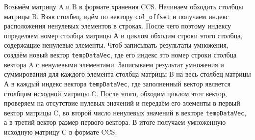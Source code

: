 \documentclass[14pt,a4paper,report]{ncc}
\begin{document}
	
	
	
	
	
	Возьмём матрицу A и B в формате хранения CCS. Начинаем обходить столбцы матрицы B. Взяв столбец, идём по вектору \verb|col_offset| и получаем индекс расположения ненулевых элементов в строках. После чего поэтому индексу определяем номер столбца матрицы А и циклом обходим строки этого столбца, содержащие ненулевые элементы. Чтоб записывать результаты умножения, создаём новый вектор \verb|tempDataVec|, где его индекс это номер строки столбца вектора A с ненулевыми элементами. Записываем результат умножения и суммирования для каждого элемента столбца матрицы B на весь столбец матрицы А в каждый индекс вектора \verb|tempDataVec|, где заполненный вектор является столбцом исходной матрицы C. После этого, обходим циклом этот вектор, проверяем на отсутствие нулевых значений и передаём его элементы в первый вектор матрицы C, во второй число ненулевых значений в векторе \verb|tempDataVec|, а в третий вектор размер первого вектора. В итоге получаем умноженную исходную матрицу C в формате CCS.
	
	
	
	
	
	
	

	
	
	
	
\end{document}
